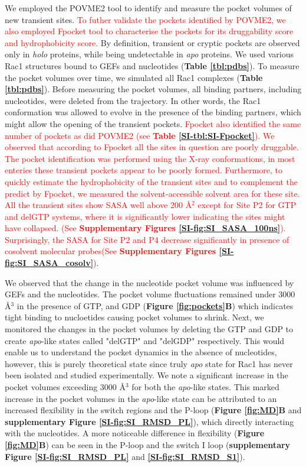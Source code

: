 \documentclass[12pt,a4paper]{achemso}
\begin{document}
We employed the POVME2\cite{durrant2014povme} tool to identify and measure the pocket volumes of new transient sites. \textcolor{red}{To futher validate the pockets identified by POVME2, we also employed Fpocket\cite{le2009fpocket} tool to characterise the pockets for its druggability score and hydrophobicity score.} By definition, transient or cryptic pockets are observed only in \textit{holo} proteins, while being undetectable in \textit{apo} proteins. We used various Rac1 structures bound to GEFs and nucleotides (\textbf{Table \ref{tbl:pdbs}}). To measure the pocket volumes over time, we simulated all Rac1 complexes (\textbf{Table \ref{tbl:pdbs}}). Before measuring the pocket volumes, all binding partners, including nucleotides, were deleted from the trajectory. In other words, the Rac1 conformation was allowed to evolve in the presence of the binding partners, which might allow the opening of the transient pockets. \textcolor{red}{Fpocket also identified the same number of pockets as did POVME2 (see \textbf{Table \ref{SI-tbl:SI-Fpocket}}).  We observed that according to Fpocket all the sites in question are poorly druggable. The pocket identification was performed using the X-ray conformations, in most enteries these transient pockets appear to be poorly formed.} \textcolor{red}{ Furthermore, to quickly estimate the hydrophobicity of the transient sites and to complement the predict by Fpocket, we measured the solvent-accessible solvent area for these site.  All the transient sites show SASA well above 200 \r{A}$^2$ except for Site P2 for GTP and delGTP systems, where it is significantly lower indicating the sites might have collapsed. (See \textbf{Supplementary Figures \ref{SI-fig:SI_SASA_100ns}}). Surprisingly, the SASA for Site P2 and P4 decrease significantly in presence of cosolvent molecular probes(See \textbf{Supplementary Figures \ref{SI-fig:SI_SASA_cosolv}})}.

We observed that the change in the nucleotide pocket volume was influenced by GEFs and the nucleotides. The pocket volume fluctuations remained under 3000 \r{A}$^3$ in the presence of GTP, and GDP (\textbf{Figure \ref{fig:pockets}B}) which indicates tight binding to nucloetides causing pocket volumes to shrink. Next, we monitored the changes in the pocket volumes by deleting the GTP and GDP to create \textit{apo}-like states called "delGTP" and "delGDP" respectively. This would enable us to understand the pocket dynamics in the absence of nucleotides, however, this is purely theoretical state since truly \textit{apo} state for Rac1 has never been isolated and studied experimentally.  We note a significant increase in the pocket volumes exceeding 3000 \r{A}$^3$ for both the \textit{apo}-like states. This marked increase in the pocket volumes in the \textit{apo}-like state can be attributed to an increased flexibility in the switch regions and the P-loop (\textbf{Figure \ref{fig:MD}B} and \textbf{supplementary Figure \ref{SI-fig:SI_RMSD_PL}}), which directly interacting with the nucleotides. A more noticeable difference in flexibility (\textbf{Figure \ref{fig:MD}B}) can be seen in the P-loop and the switch I loop (\textbf{supplementary Figure \ref{SI-fig:SI_RMSD_PL}} and \textbf{\ref{SI-fig:SI_RMSD_S1}}). 
\end{document}
